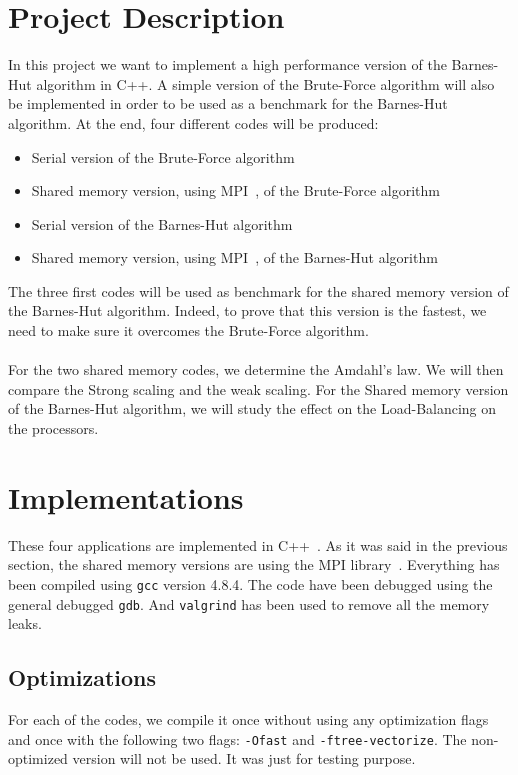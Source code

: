 \documentclass[11pt,a4paper]{article}
\begin{document}
\section{Project Description}

In this project we want to implement a high performance version of the Barnes-Hut algorithm in C++. A simple version of the Brute-Force algorithm will also be implemented in order to be used as a benchmark for the Barnes-Hut algorithm. At the end, four different codes will be produced:
\begin{itemize}
\item Serial version of the Brute-Force algorithm
\item Shared memory version, using MPI~\cite{mpi}, of the Brute-Force algorithm
\item Serial version of the Barnes-Hut algorithm
\item Shared memory version, using MPI~\cite{mpi}, of the Barnes-Hut algorithm
\end{itemize}
The three first codes will be used as benchmark for the shared memory version of the Barnes-Hut algorithm. Indeed, to prove that this version is the fastest, we need to make sure it overcomes the Brute-Force algorithm. 
\\\\
For the two shared memory codes, we determine the Amdahl's law. We will then compare the Strong scaling and the weak scaling. For the Shared memory version of the Barnes-Hut algorithm, we will study the effect on the Load-Balancing on the processors. 

\section{Implementations}

These four applications are implemented in C++~\cite{c++}. As it was said in the previous section, the shared memory versions are using the MPI library~\cite{mpi}. Everything has been compiled using \verb+gcc+ version 4.8.4. The code have been debugged using the general debugged \verb+gdb+. And \verb+valgrind+ has been used to remove all the memory leaks. 

\subsection{Optimizations}

For each of the codes, we compile it once without using any optimization flags and once with the following two flags: \verb+-Ofast+ and \verb+-ftree-vectorize+. The non-optimized version will not be used. It was just for testing purpose.
\end{document}
